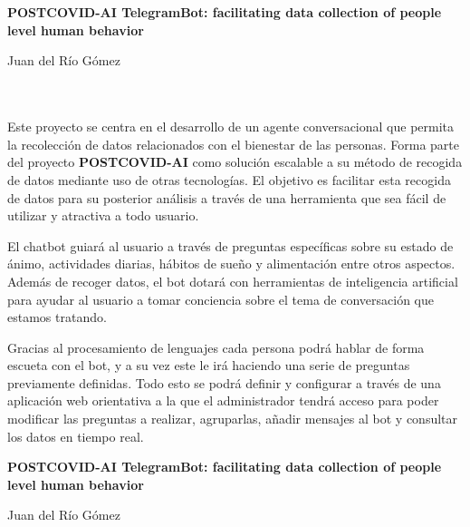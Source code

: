 \chapter*{}
\thispagestyle{empty}


\begin{center}
{\large\bfseries POSTCOVID-AI TelegramBot: facilitating data collection of people level human behavior }\\
\end{center}
\begin{center}
Juan del Río Gómez\\
\end{center}
\vspace{0.7cm}
\\

\vspace{0.7cm}
\\

Este proyecto se centra en el desarrollo de un agente conversacional que permita la
recolección de datos relacionados con el bienestar de las personas. Forma parte del proyecto {\bfseries POSTCOVID-AI} como solución escalable a su método de recogida de datos mediante uso de otras tecnologías. El objetivo es facilitar esta recogida de datos para su posterior análisis a través de una herramienta que sea fácil de utilizar y atractiva a todo usuario.\vspace{0.3cm}

El chatbot guiará al usuario a través de preguntas específicas sobre su estado de ánimo,
actividades diarias, hábitos de sueño y alimentación entre otros aspectos. Además de recoger
datos, el bot dotará con herramientas de inteligencia artificial para ayudar al usuario a tomar
conciencia sobre el tema de conversación que estamos tratando.\vspace{0.3cm}

Gracias al procesamiento de lenguajes cada persona podrá hablar de forma escueta con el bot,
y a su vez este le irá haciendo una serie de preguntas previamente definidas. Todo esto se podrá definir y configurar a través de una aplicación web orientativa a la que el administrador tendrá acceso para poder
modificar las preguntas a realizar, agruparlas, añadir mensajes al bot y consultar los datos en tiempo real.


\cleardoublepage
\thispagestyle{empty}

\begin{center}
{\large\bfseries POSTCOVID-AI TelegramBot: facilitating data collection of people level human behavior }\\
\end{center}
\begin{center}
Juan del Río Gómez\\
\end{center}
\vspace{0.7cm}
\\

